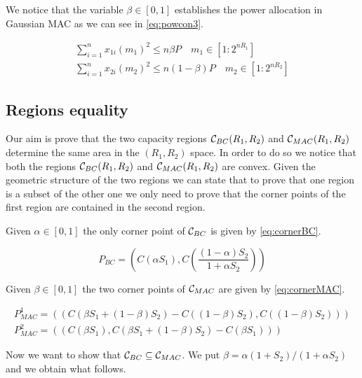 We notice that the variable $\beta \in [0,1]$ establishes the power allocation in Gaussian MAC as we can see in \eqref{eq:powcon3}.

\begin{equation}
	\begin{gathered}
		\sum_{i=1}^n x_{1i}(m_1)^2 \leq n \beta P \quad m_1 \in [1:2^{nR_1}]\\
		\sum_{i=1}^n x_{2i}(m_2)^2 \leq n (1- \beta ) P \quad m_2 \in [1:2^{nR_2}]
	\end{gathered}
	\label{eq:powcon3}
\end{equation}

\subsection{Regions equality}

Our aim is prove that the two capacity regions $\mathcal{C}_{BC}(R_1, R_2)$ and $\mathcal{C}_{MAC}(R_1, R_2)$ determine the same area in the $(R_1, R_2)$ space. In order to do so we notice that both the regions $\mathcal{C}_{BC}(R_1, R_2)$ and $\mathcal{C}_{MAC}(R_1, R_2)$ are convex. Given the geometric structure of the two regions we can state that to prove that one region is a subset of the other one we only need to prove that the corner points of the first region are contained in the second region.

Given $\alpha \in [0,1]$ the only corner point of $\mathcal{C}_{BC}$ is given by \eqref{eq:cornerBC}.

\begin{equation}
	P_{BC} = \left( C(\alpha S_1) , C \left( \frac{(1-\alpha)S_2}{1+\alpha S_2} \right) \right)
	\label{eq:cornerBC}
\end{equation}

Given $\beta \in [0,1]$ the two corner points of $\mathcal{C}_{MAC}$ are given by \eqref{eq:cornerMAC}.

\begin{equation}
	\begin{gathered}
		P_{MAC}^1 = (\left( C (\beta S_1 + (1-\beta)S_2) - C((1-\beta)S_2) , C \left( (1-\beta)S_2 \right) \right)) \\ P_{MAC}^2 = (\left(C \left(\beta S_1 \right), C (\beta S_1 + (1-\beta)S_2) - C(\beta S_1) \right))
	\end{gathered}
	\label{eq:cornerMAC}
\end{equation}

Now we want to show that $\mathcal{C}_{BC} \subseteq \mathcal{C}_{MAC}$. We put $\beta = \alpha(1+S_2)/(1+\alpha S_2)$ and we obtain what follows.

